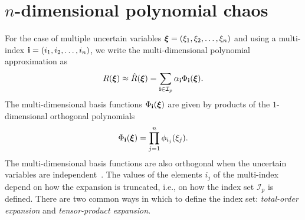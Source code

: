 \section{$n$-dimensional polynomial chaos}
\label{sec:nd_pc}
For the case of multiple uncertain variables \(\boldsymbol{\xi} = (\xi_1,\xi_2,\ldots,\xi_n)\) and using a multi-index \(\mathbf{i}=(i_1,i_2,\ldots,i_n)\), we write the multi-dimensional polynomial approximation as
\begin{equation}
  R(\boldsymbol{\xi}) \approx \hat{R}(\boldsymbol{\xi}) = \sum_{\mathbf{i}\in \mathcal{I}_p} \alpha_{\mathbf{i}} \Phi_{\mathbf{i}}(\boldsymbol{\xi}).
  \label{eq:ND_expansion}
\end{equation}
The multi-dimensional basis functions \(\Phi_{\mathbf{i}}(\boldsymbol{\xi})\) are given by products of the $1$-dimensional orthogonal polynomials
\begin{equation}
	\Phi_{\mathbf{i}}(\boldsymbol{\xi})  = \prod_{j=1}^n \phi_{i_j}(\xi_j).
  \label{eq:ndPolynomials}
\end{equation}
The multi-dimensional basis functions are also orthogonal when the uncertain variables are independent~\cite{Padron2017}.
The values of the elements \(i_j\) of the multi-index depend on how the expansion is truncated, i.e., on how the index set \(\mathcal{I}_p\) is defined. There are two common ways in which to define the index set: \textit{total-order expansion} and \textit{tensor-product expansion}.

